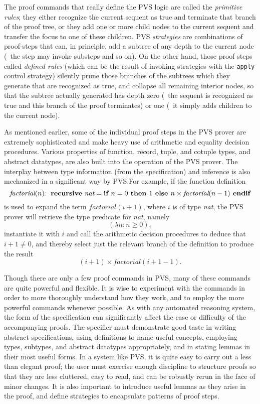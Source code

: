 \documentclass[12pt,twoside]{book}
\makeatletter
\newcommand{\indtt}[1]{\texttt{#1}\index{#1@{\texttt{#1}}}}  %
\makeatother
\begin{document}
The proof commands that really define the PVS logic are called the
\emph{primitive rules}; they either recognize the current sequent as
true and terminate that branch of the proof tree, or they add one or
more child nodes to the current sequent and transfer the focus to one of
these children.  PVS \emph{strategies} are combinations of
proof-steps that can, in principle, add a subtree of any depth to the
current node (\ie\ the step may invoke substeps and so on).  On the
other hand, those proof steps called \emph{defined rules} (which can be
the result of invoking strategies with the \indtt{apply} control strategy)
silently prune those branches of the subtrees which they generate that
are recognized as true, and collapse all remaining interior nodes, so
that the subtree actually generated has depth zero (\ie\ the sequent is
recognized as true and this branch of the proof terminates) or one (\ie\
it simply adds children to the current node).

As mentioned earlier, some of the individual proof steps in the PVS prover
are extremely sophisticated and make heavy use of arithmetic and equality
decision procedures.  Various properties of function, record, tuple, and
cotuple types, and abstract datatypes, are also built into the operation
of the PVS prover.  The interplay between type information (from the
specification) and inference is also mechanized in a significant way by
PVS.\@ For example, if the function definition \[\textit{factorial}(n)
{\bf :\ recursive\ } \textit{nat} = \mbox{\bf if\ } n=0 \mbox{\bf \ then } 1 \mbox{\bf \ else } n\times
\textit{factorial}(n-1) \mbox{\bf \ endif}\] is used to expand the term
$\textit{factorial}(i+1)$, where $i$ is of type \emph{nat}, the PVS prover
will retrieve the type predicate for \emph{nat}, namely \[(\lambda n: n
\geq 0),\] instantiate it with $i$ and call the arithmetic decision
procedures to deduce that $i+1 \neq 0$, and thereby select just the
relevant branch of the definition to produce the result \[ (i+1)\times
\textit{factorial}(i+1-1). \]

Though there are only a few proof commands in PVS, many of these commands
are quite powerful and flexible.  It is wise to experiment with the
commands in order to more thoroughly understand how they work, and to
employ the more powerful commands whenever possible.  As with any
automated reasoning system, the form of the specification can
significantly affect the ease or difficulty of the accompanying proofs.
The specifier must demonstrate good taste in writing abstract
specifications, using definitions to name useful concepts, employing
types, subtypes, and abstract datatypes appropriately, and in stating
lemmas in their most useful forms.  In a system like PVS, it is quite easy
to carry out a less than elegant proof; the user must exercise enough
discipline to structure proofs so that they are less cluttered, easy to
read, and can be robustly rerun in the face of minor changes.  It is also
important to introduce useful lemmas as they arise in the proof, and
define strategies to encapsulate patterns of proof steps.
\end{document}
